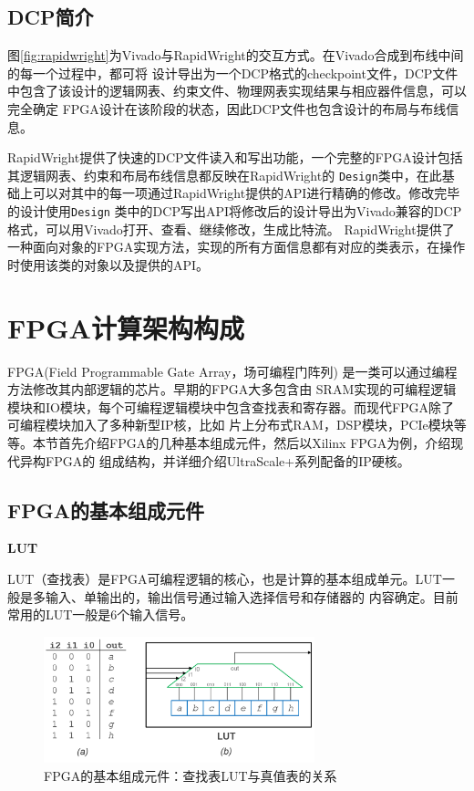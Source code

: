 \subsection{DCP简介}

图\ref{fig:rapidwright}为Vivado与RapidWright的交互方式。在Vivado合成到布线中间的每一个过程中，都可将
设计导出为一个DCP格式的checkpoint文件，DCP文件中包含了该设计的逻辑网表、约束文件、物理网表实现结果与相应器件信息，可以完全确定
FPGA设计在该阶段的状态，因此DCP文件也包含设计的布局与布线信息。

RapidWright提供了快速的DCP文件读入和写出功能，一个完整的FPGA设计包括其逻辑网表、约束和布局布线信息都反映在RapidWright的
\texttt{Design}类中，在此基础上可以对其中的每一项通过RapidWright提供的API进行精确的修改。修改完毕的设计使用\texttt{Design}
类中的DCP写出API将修改后的设计导出为Vivado兼容的DCP格式，可以用Vivado打开、查看、继续修改，生成比特流。
RapidWright提供了一种面向对象的FPGA实现方法，实现的所有方面信息都有对应的类表示，在操作时使用该类的对象以及提供的API。


\section{FPGA计算架构构成}

FPGA(Field Programmable Gate Array，场可编程门阵列) 是一类可以通过编程方法修改其内部逻辑的芯片。早期的FPGA大多包含由
SRAM实现的可编程逻辑模块和IO模块，每个可编程逻辑模块中包含查找表和寄存器。而现代FPGA除了可编程模块加入了多种新型IP核，比如
片上分布式RAM，DSP模块，PCIe模块等等。本节首先介绍FPGA的几种基本组成元件，然后以Xilinx FPGA为例，介绍现代异构FPGA的
组成结构，并详细介绍UltraScale+系列配备的IP硬核。

\subsection{FPGA的基本组成元件}

{\bf LUT}

LUT（查找表）是FPGA可编程逻辑的核心，也是计算的基本组成单元。LUT一般是多输入、单输出的，输出信号通过输入选择信号和存储器的
内容确定。目前常用的LUT一般是6个输入信号。

\begin{figure}[h]
	\centering
	\includegraphics[width=0.7\textwidth]{figure/luts}
	\caption{FPGA的基本组成元件：查找表LUT与真值表的关系} 
	\label{fig:lut}
\end{figure}

